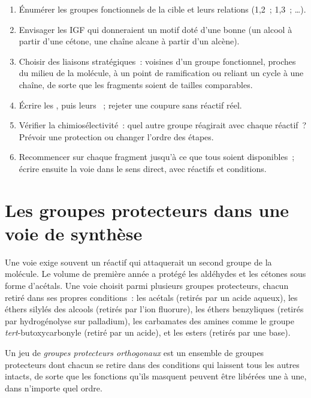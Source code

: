 \begin{method}\label{met:b2:retrosynthesis:retrosynthesis}
\begin{enumerate}
  \item Énumérer les groupes fonctionnels de la cible et leurs relations (1,2~; 1,3~; \dots).
  \item Envisager les IGF qui donneraient un motif doté d'une bonne  (un alcool à partir d'une
        cétone, une chaîne alcane à partir d'un alcène).
  \item Choisir des liaisons stratégiques~: voisines d'un groupe fonctionnel, proches du milieu de la
        molécule, à un point de ramification ou reliant un cycle à une chaîne, de sorte que les fragments
        soient de tailles comparables.
  \item Écrire les , puis leurs ~; rejeter une coupure sans réactif réel.
  \item Vérifier la chimiosélectivité~: quel autre groupe réagirait avec chaque réactif~? Prévoir une
        protection ou changer l'ordre des étapes.
  \item Recommencer sur chaque fragment jusqu'à ce que tous soient disponibles~; écrire ensuite la voie dans
        le sens direct, avec réactifs et conditions.
\end{enumerate}
\end{method}

\section{Les groupes protecteurs dans une voie de synthèse}

Une voie exige souvent un réactif qui attaquerait un second groupe de la molécule. Le volume de première
année a protégé les aldéhydes et les cétones sous forme d'acétals. Une voie choisit parmi plusieurs
groupes protecteurs, chacun retiré dans ses propres conditions~: les acétals (retirés par un acide
aqueux), les éthers silylés des alcools (retirés par l'ion fluorure), les éthers benzyliques (retirés
par hydrogénolyse sur palladium), les carbamates des amines comme le groupe
\textit{tert}-butoxycarbonyle (retiré par un acide), et les esters (retirés par une base).

\begin{definition}\label{def:b2:retrosynthesis:orthogonal}
Un jeu de \emph{groupes protecteurs orthogonaux} est un ensemble de
groupes protecteurs dont chacun se retire dans des conditions qui laissent tous les autres intacts, de
sorte que les fonctions qu'ils masquent peuvent être libérées une à une, dans n'importe quel ordre.
\end{definition}

